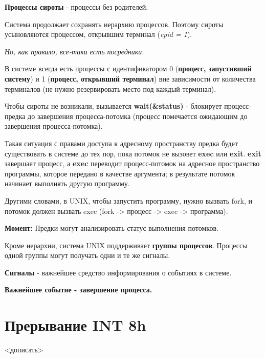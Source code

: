\documentclass[14pt, a4paper]{article}
\begin{document}
	{\bf Процессы сироты} - процессы без родителей.
	
	Система продолжает сохранять иерархию процессов. Поэтому сироты усыновляются процессом, открывшим терминал ({\it cpid = 1}).
	
	{\it Но, как правило, все-таки есть посредники.}
	
	В системе всегда есть процессы с идентификатором 0 ({\bf процесс, запустивший систему}) и 1 ({\bf процесс, открывший терминал}) вне зависимости от количества терминалов (не нужно резервировать место под каждый терминал).
	
	Чтобы сироты не возникали, вызывается {\bf wait(\&status)} - блокирует процесс-предка до завершения процесса-потомка (процесс помечается ожидающим до завершения процесса-потомка).
	
	Такая ситуация с правами доступа к адресному пространству предка будет существовать в системе до тех пор, пока потомок не вызовет {\bf exec} или {\bf exit}. {\bf exit} завершает процесс, а {\bf exec} переводит процесс-потомок на адресное пространство программы, которое передано в качестве аргумента; в результате потомок начинает выполнять другую программу.
	
	Другими словами, в UNIX, чтобы запустить программу, нужно вызвать fork, и потомок должен вызвать exec (fork -> процесс -> exec -> программа).
	
	{\bf Момент:} Предки могут анализировать статус выполнения потомков.
	
	Кроме иерархии, система UNIX поддерживает {\bf группы процессов}. Процессы одной группы могут получать одни и те же сигналы.
	
	{\bf Сигналы} - важнейшее средство информирования о событиях в системе.
	
	{\bf Важнейшее событие - завершение процесса.}
	
	\section*{Прерывание INT 8h}
	
	<дописать>
\end{document}
